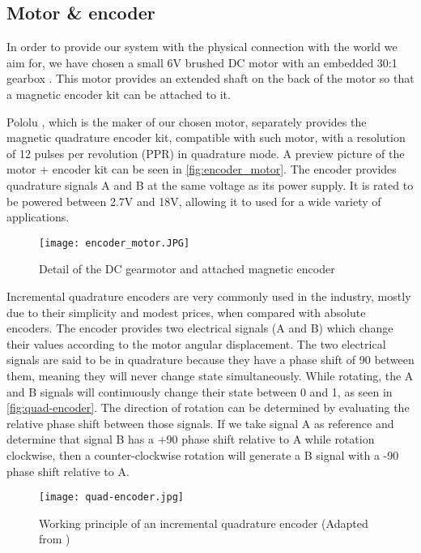 \subsection{Motor \& encoder}
In order to provide our system with the physical connection with the world we aim for, we have chosen a small 6V brushed DC motor with an embedded 30:1 gearbox \cite{product:pololu-micrometal-gearmotor}.
This motor provides an extended shaft on the back of the motor so that a magnetic encoder kit can be attached to it.

Pololu \cite{brand:pololu}, which is the maker of our chosen motor, separately provides the magnetic quadrature encoder kit, compatible with such motor, with a resolution of 12 pulses per revolution (PPR) in quadrature mode.
A preview picture of the motor + encoder kit can be seen in \autoref{fig:encoder_motor}.
The encoder provides quadrature signals A and B at the same voltage as its power supply.
It is rated to be powered between 2.7V and 18V, allowing it to used for a wide variety of applications.

\begin{figure}[htp]
	\centering
	\texttt{[image: encoder\_motor.JPG]}
	\caption{Detail of the DC gearmotor and attached magnetic encoder}
	\label{fig:encoder_motor}
\end{figure}

Incremental quadrature encoders are very commonly used in the industry, mostly due to their simplicity and modest prices, when compared with absolute encoders.
The encoder provides two electrical signals (A and B) which change their values according to the motor angular displacement.
The two electrical signals are said to be in quadrature because they have a phase shift of 90\textdegree{} between them, meaning they will never change state simultaneously.
While rotating, the A and B signals will continuously change their state between 0 and 1, as seen in \autoref{fig:quad-encoder}.
The direction of rotation can be determined by evaluating the relative phase shift between those signals.
If we take signal A as reference and determine that signal B has a +90\textdegree{} phase shift relative to A while rotation clockwise, then a counter-clockwise rotation will generate a B signal with a -90\textdegree{} phase shift relative to A.

\begin{figure}[htp]
	\centering
	\texttt{[image: quad-encoder.jpg]}
	\caption{Working principle of an incremental quadrature encoder (Adapted from \cite{technology:quad-encoder})}
	\label{fig:quad-encoder}
\end{figure}

